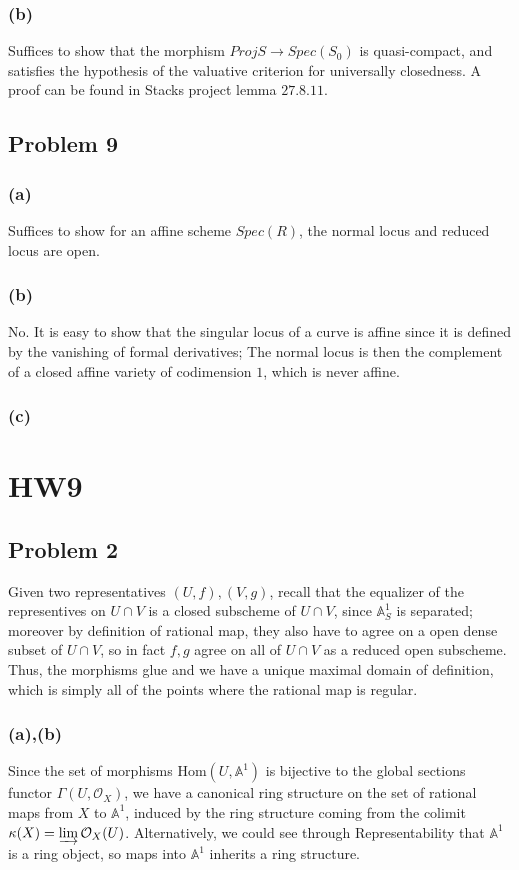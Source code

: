 \documentclass{article}
\theoremstyle{definition}
\theoremstyle{definition}
\theoremstyle{definition}
\theoremstyle{definition}
\theoremstyle{definition}
\theoremstyle{definition}
\theoremstyle{definition}
\begin{document}
\subsubsection*{(b)}
Suffices to show that the morphism $Proj S\to Spec(S_0)$ is quasi-compact, and satisfies the hypothesis of the valuative criterion for universally closedness. A proof can be found in Stacks project lemma $27.8.11$. 

\subsection*{Problem 9}
\subsubsection*{(a)}
Suffices to show for an affine scheme $Spec(R)$, the normal locus and reduced locus are open.
\subsubsection*{(b)}
No. It is easy to show that the singular locus of a curve is affine since it is defined by the vanishing of formal derivatives; The normal locus is then the complement of a closed affine variety of codimension $1$, which is never affine. 



\subsubsection*{(c)}

\section*{HW9}

\subsection*{Problem 2}
Given two representatives $(U,f), (V,g)$, recall that the equalizer of the representives on $U\cap V$ is a closed subscheme of $U\cap V$, since $\mathbb{A}^1_S$ is separated; moreover by definition of rational map, they also have to agree on a open dense subset of $U\cap V$, so in fact $f,g$ agree on all of $U\cap V$ as a reduced open subscheme. Thus, the morphisms glue and we have a unique maximal domain of definition, which is simply all of the points where the rational map is regular. 

\subsubsection*{(a),(b)}
Since the set of morphisms $\textrm{Hom}(U,\mathbb{A}^1)$ is bijective to the global sections functor $\Gamma(U,\mathcal{O}_X)$, we have a canonical ring structure on the set of rational maps from $X$ to $\mathbb{A}^1$, induced by the ring structure coming from the colimit $\kappa(X)=\varinjlim \mathcal{O}_X(U)$. Alternatively, we could see through Representability that $\mathbb{A}^1$ is a ring object, so maps into $\mathbb{A}^1$ inherits a ring structure.
\end{document}
